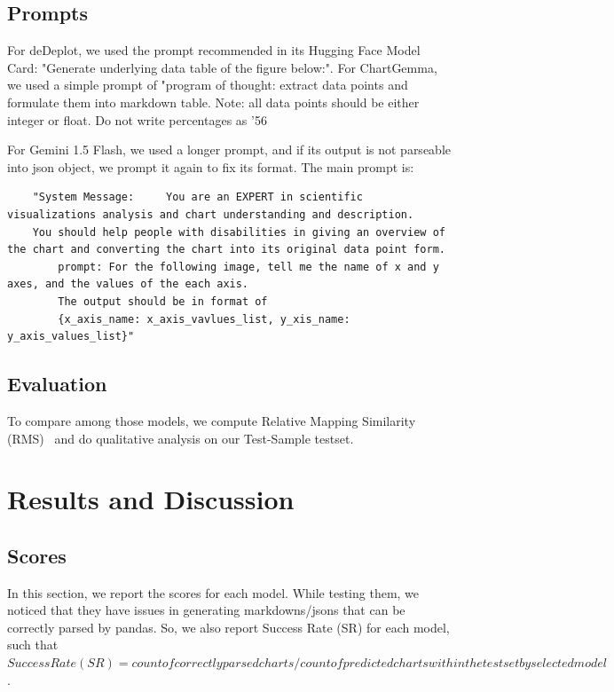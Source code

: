 \documentclass[
	letterpaper, %
]{jdf}
\begin{document}
       \subsection{Prompts}\label{ssect:prompts}
       For deDeplot, we used the prompt recommended in its Hugging Face Model Card: "Generate underlying data table of the figure below:".
       For ChartGemma, we used a simple prompt of "program of thought: extract data points and formulate them into markdown table.
    Note: all data points should be either integer or float.
    Do not write percentages as '56%

    For Gemini 1.5 Flash, we used a longer prompt, and if its output is not parseable into json object, we prompt it again to fix its format.
    The main prompt is: 
\begin{verbatim}
    "System Message:     You are an EXPERT in scientific visualizations analysis and chart understanding and description.
    You should help people with disabilities in giving an overview of the chart and converting the chart into its original data point form.
        prompt: For the following image, tell me the name of x and y axes, and the values of the each axis.
        The output should be in format of 
        {x_axis_name: x_axis_vavlues_list, y_xis_name: y_axis_values_list}"
        \end{verbatim}

\subsection{Evaluation}\label{ssect:method-eval}
To compare among those models, we compute Relative Mapping Similarity (RMS)~\cite{liu2022deplot} and do qualitative analysis on our Test-Sample testset.

\section{Results and Discussion}\label{sect:results}
\subsection{Scores}\label{ssect:rms}
In this section, we report the scores for each model.
While testing them, we noticed that they have issues in generating markdowns/jsons that can be correctly parsed by pandas.
So, we also report Success Rate (SR) for each model, such that $Success Rate (SR) = count of correctly parsed charts/count of predicted charts within the testset by selected model$.
\end{document}
